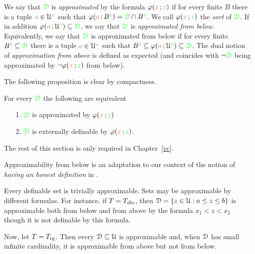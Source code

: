 \begin{definition}\label{def_approx}
We say that ${\color{green}\EuScript D}$ is \emph{approximated\/} by the formula $\varphi({\color{brown} x}\,;{\color{green} z})$ if for every finite $B$ there is a tuple ${\color{brown} a}\in\EuScript U^{\color{brown} x}$ such that $\varphi({\color{brown} a}\,;B^{\color{green} z})={\color{green}\EuScript D}\cap B^{\color{green} z}$.
We call $\varphi({\color{brown} x}\,;{\color{green} z})$ the \emph{sort} of ${\color{green}\EuScript D}$.
If in addition $\varphi({\color{brown} a}\,;\EuScript U^{\color{green} z})\subseteq{\color{green}\EuScript D}$, we say that  ${\color{green}\EuScript D}$ is \emph{approximated from below}.
Equivalently, we say that  ${\color{green}\EuScript D}$ is approximated from below if for every finite $B^{\color{green} z}\subseteq{\color{green}\EuScript D}$ there is a tuple ${\color{brown} a}\in\EuScript U^{\color{brown} x}$ such that  $B^{\color{green} z}\subseteq\varphi({\color{brown} a}\,;\EuScript U^{\color{green} z})\subseteq{\color{green}\EuScript D}$.
The dual notion of \emph{approximation from above\/} is defined as expected (and coincides with $\neg{\color{green}\EuScript D}$ being approximated by $\neg\varphi({\color{brown} x}\,;{\color{green} z})$ from below).
\end{definition} 

The following proposition is clear by compactness.

\begin{proposition}\label{prop_approx=external}
   For every ${\color{green}\EuScript D}$ the following are equivalent
   \begin{itemize}
   \item[1.] ${\color{green}\EuScript D}$ is approximated by $\varphi({\color{brown} x}\,;{\color{green} z})$
   \item[2.] ${\color{green}\EuScript D}$ is externally definable by $\varphi({\color{brown} x}\,;{\color{green} z})$.
   \end{itemize}
\end{proposition}

The rest of this section is only required in Chapter~\ref{vc}.

Approximability from below is an adaptation to our context of the notion of \textit{having an honest definition} in \cite{CS}.

\begin{example}
Every definable set is trivially approximable.
Sets may be approximable by different formulas.
For instance, if $T=T_{\rm dlo}$, then $\EuScript D=\{z\in\EuScript U:a\le z\le b\}$ is approximable both from below and from above by the formula $x_1<z<x_2$ though it is not definable by this formula.

Now, let $T=T_{\rm rg}$.
Then every $\EuScript D\subseteq\EuScript U$ is approximable and, when $\EuScript D$ has small infinite cardinality, it is approximable from above but not from below.
\end{example}

